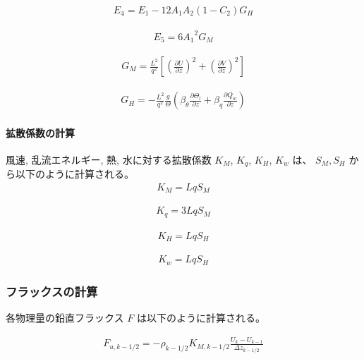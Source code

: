 \begin{eqnarray}E_4=E_1-12A_1A_2(1-C_2)G_H\end{eqnarray}

\begin{eqnarray}E_5=6{A_1}^2G_M\end{eqnarray}

\begin{eqnarray}G_M=\frac{L^2}{q^2}\left[\left(\frac{\partial U}{\partial z}\right)^2+\left(\frac{\partial V}{\partial z}\right)^2\right]\end{eqnarray}

\begin{eqnarray}G_H=-\frac{L^2}{q^2}\frac{g}{\Theta}\left(\beta_\theta \frac{\partial \Theta_l}{\partial z}+\beta_q \frac{\partial Q_w}{\partial z}\right)\end{eqnarray}

\hypertarget{ux62e1ux6563ux4fc2ux6570ux306eux8a08ux7b97-1}{%
\paragraph{拡散係数の計算}\label{ux62e1ux6563ux4fc2ux6570ux306eux8a08ux7b97-1}}

風速, 乱流エネルギー, 熱, 水に対する拡散係数 \(K_M\), \(K_q\), \(K_H\), \(K_w\) は、 \(S_M,S_H\) から以下のように計算される。 \begin{eqnarray}K_M=LqS_M\end{eqnarray}

\begin{eqnarray}K_q=3LqS_M\end{eqnarray}

\begin{eqnarray}K_H=LqS_H\end{eqnarray}

\begin{eqnarray}K_w=LqS_H\end{eqnarray}

\hypertarget{ux30d5ux30e9ux30c3ux30afux30b9ux306eux8a08ux7b97}{%
\subsubsection{フラックスの計算}\label{ux30d5ux30e9ux30c3ux30afux30b9ux306eux8a08ux7b97}}

各物理量の鉛直フラックス \(F\) は以下のように計算される。

\begin{eqnarray}F_{u,k-1/2}=-\rho_{k-1/2}K_{M,k-1/2}\frac{U_{k}-U_{k-1}}{\Delta z_{k-1/2}}\end{eqnarray}

